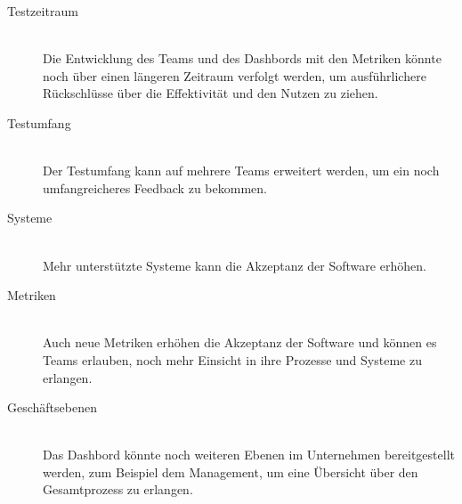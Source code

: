 \begin{description}
    \item[Testzeitraum] \hfill \\ Die Entwicklung des Teams und des Dashbords mit den Metriken könnte noch über einen längeren Zeitraum verfolgt werden, um ausführlichere Rückschlüsse über die Effektivität und den Nutzen zu ziehen.
    \item[Testumfang] \hfill \\ Der Testumfang kann auf mehrere Teams erweitert werden, um ein noch umfangreicheres Feedback zu bekommen.
    \item[Systeme] \hfill \\ Mehr unterstützte Systeme kann die Akzeptanz der Software erhöhen.
    \item[Metriken] \hfill \\ Auch neue Metriken erhöhen die Akzeptanz der Software und können es Teams erlauben, noch mehr Einsicht in ihre Prozesse und Systeme zu erlangen.
    \item[Geschäftsebenen] \hfill \\ Das Dashbord könnte noch weiteren Ebenen im Unternehmen bereitgestellt werden, zum Beispiel dem Management, um eine Übersicht über den Gesamtprozess zu erlangen.
\end{description}
